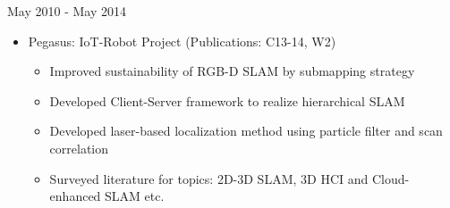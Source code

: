 \begin{cventries}
		{May 2010 - May 2014} %
		{
			\vspace{-4.0mm}
			\begin{justify}
				\begin{itemize}[leftmargin=2ex, nosep, noitemsep]
					\setlength{\parskip}{0pt}
					\renewcommand{\labelitemi}{\bullet}
					\item {Pegasus: IoT-Robot Project (Publications: C13-14, W2)}
					\begin{itemize}[leftmargin=3ex]
						\scriptsize
						\item {Improved sustainability of RGB-D SLAM by submapping strategy}
						\item {Developed Client-Server framework to realize hierarchical SLAM}
						\item {Developed laser-based localization method using particle filter and scan correlation}
						\item {Surveyed literature for topics: 2D-3D SLAM, 3D HCI and Cloud-enhanced SLAM etc.}
					\end{itemize}
				\end{itemize}
			\end{justify}
			\vspace{-4.0mm}  
		}

\end{cventries}
